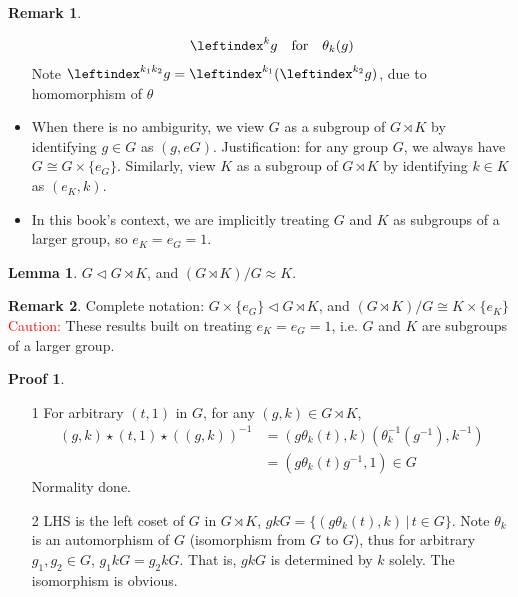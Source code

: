 \documentclass{book}
\theoremstyle{definition}
\newtheorem{lemma}{Lemma}[chapter]
\theoremstyle{remarkstyle}
\newtheorem*{remark}{Remark}%
\newtheorem*{myproof}{Proof}%
\begin{document}
\begin{remark}
\begin{itemize}
$$\begin{array}{rcl}
            \leftindex^k {g} & \textrm{for} & \theta_{k}(g) \\
        \end{array}
        $$
        Note $\leftindex^{{k_{1}}k_{{2}}} {g} = \leftindex^{k_{1}} {(\leftindex^{k_{2}} {g})} $, due to homomorphism of $\theta$
        \item When there is no ambigurity, we view $G$ as a subgroup of $G\rtimes K$ by identifying $g\in G$ as $(g,e{G})$. Justification: for any group $G$, we always have $G \cong G \times \{e_{G}\}$. Similarly, view $K$ as a subgroup of $G \rtimes K$ by identifying $k\in K$ as $(e_{K}, k) $. 
        \item In this book's context, we are implicitly treating $G$ and $K$ as subgroups of a larger group, so $e_{K} = e_{G} = 1 $.
        \item[] 
    \end{itemize}
\end{remark}


\begin{lemma}
    $G \triangleleft G\rtimes K $, and $(G \rtimes K)/G \approx K $.
\end{lemma}
\begin{remark}
    Complete notation: $G \times \{e_{G}\} \triangleleft G\rtimes K $, and $(G \rtimes K)/G \cong K \times \{e_{K}\} $ \newline \textcolor{red}{Caution:} These results built on treating $e_{K} = e_{G} = 1 $, i.e. $G$ and $K$ are subgroups of a larger group.
\end{remark}
\begin{myproof}
    \begin{itemize}
        \item[]
        \item[1] For arbitrary $(t,1)$ in $G$, for any $(g,k) \in G\rtimes K $, 
        \begin{align*}
            (g,k)\star(t,1)\star((g,k))^{-1} &= (g\theta_{k}(t), k)(\theta^{-1}_{k}(g^{-1}),k^{-1}) \\
            &= (g\theta_{k}(t)g^{-1},1) \in G   
        \end{align*}
        Normality done.
        \item[2] LHS is the left coset of $G$ in $G \rtimes K$, $gkG=\{(g\theta_{k}(t),k) \, \vert \, t\in G\}$. Note $\theta_{k} $ is an automorphism of $G$ (isomorphism from $G$ to $G$), thus for arbitrary $g_{1}, g_{2} \in G $, $g_{1}kG = g_{2}kG $. That is, $gkG$ is determined by $k$ solely. The isomorphism is obvious.
        \item[] 
    \end{itemize}
\end{myproof}
\end{document}
